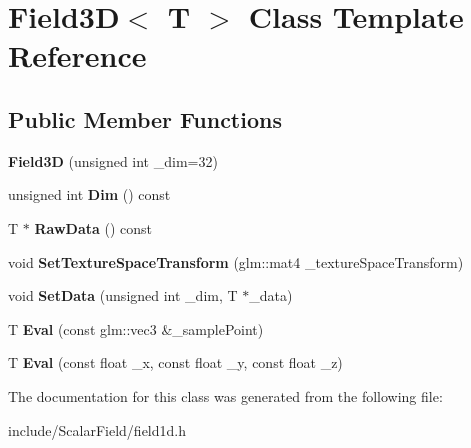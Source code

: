 \hypertarget{classField3D}{}\section{Field3D$<$ T $>$ Class Template Reference}
\label{classField3D}
\subsection*{Public Member Functions}
\begin{DoxyCompactItemize}
\item 
{\bfseries Field3D} (unsigned int \+\_\+dim=32)\hypertarget{classField3D_a2dd77c0a59fb910f5008f39037e5ef99}{}\label{classField3D_a2dd77c0a59fb910f5008f39037e5ef99}

\item 
unsigned int {\bfseries Dim} () const \hypertarget{classField3D_a59b9b29b336f55889438afccfaef3b70}{}\label{classField3D_a59b9b29b336f55889438afccfaef3b70}

\item 
T $\ast$ {\bfseries Raw\+Data} () const \hypertarget{classField3D_a68e65c95e741036ffe41cad9864a5bd7}{}\label{classField3D_a68e65c95e741036ffe41cad9864a5bd7}

\item 
void {\bfseries Set\+Texture\+Space\+Transform} (glm\+::mat4 \+\_\+texture\+Space\+Transform)\hypertarget{classField3D_acd24a0c369cc9eea5eb335fc04e3564b}{}\label{classField3D_acd24a0c369cc9eea5eb335fc04e3564b}

\item 
void {\bfseries Set\+Data} (unsigned int \+\_\+dim, T $\ast$\+\_\+data)\hypertarget{classField3D_a18448fce131024a165cf391c31a922d6}{}\label{classField3D_a18448fce131024a165cf391c31a922d6}

\item 
T {\bfseries Eval} (const glm\+::vec3 \&\+\_\+sample\+Point)\hypertarget{classField3D_a74ce66bb319360d1e033fbfc7ffe6251}{}\label{classField3D_a74ce66bb319360d1e033fbfc7ffe6251}

\item 
T {\bfseries Eval} (const float \+\_\+x, const float \+\_\+y, const float \+\_\+z)\hypertarget{classField3D_ad85aa1ff53d611d66ea0bc4e3621eb95}{}\label{classField3D_ad85aa1ff53d611d66ea0bc4e3621eb95}

\end{DoxyCompactItemize}


The documentation for this class was generated from the following file\+:\begin{DoxyCompactItemize}
\item 
include/\+Scalar\+Field/field1d.\+h\end{DoxyCompactItemize}

